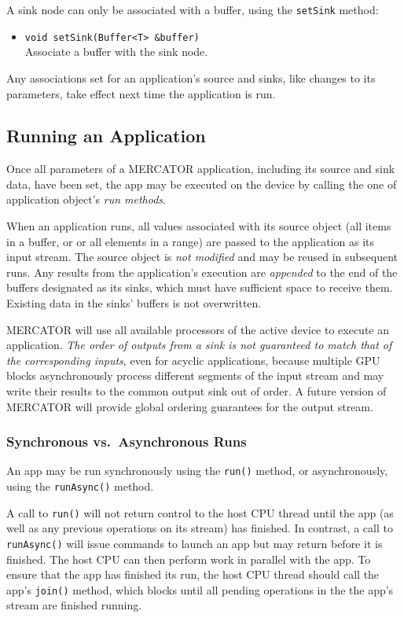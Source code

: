 \documentclass[11pt]{article}
\begin{document}
A sink node can only be associated with a buffer, using the 
\texttt{setSink} method:
\begin{itemize}

\item \texttt{void setSink(Buffer<T> \&buffer)} \\
  Associate a buffer with the sink node.

\end{itemize}
Any associations set for an application's source and sinks, like
changes to its parameters, take effect next time the application is
run.

\subsection{Running an Application}

Once all parameters of a MERCATOR application, including its source
and sink data, have been set, the app may be executed on the device by
calling the one of application object's \textit{run methods}.

When an application runs, all values associated with its source object
(all items in a buffer, or or all elements in a range) are passed to
the application as its input stream. The source object is \emph{not
  modified} and may be reused in subsequent runs.  Any results from
the application's execution are \emph{appended} to the end of the
buffers designated as its sinks, which must have sufficient space to
receive them.  Existing data in the sinks' buffers is not overwritten.

MERCATOR will use all available processors of the active device to
execute an application.  \emph{The order of outputs from a sink is not
  guaranteed to match that of the corresponding inputs}, even for
acyclic applications, because multiple GPU blocks asynchronously
process different segments of the input stream and may write their
results to the common output sink out of order.  A future version of
MERCATOR will provide global ordering guarantees for the output
stream.

\subsubsection{Synchronous vs.\ Asynchronous Runs}

An app may be run synchronously using the \texttt{run()} method,
or asynchronously, using the \texttt{runAsync()} method.

A call to \texttt{run()} will not return control to the host CPU
thread until the app (as well as any previous operations on its
stream) has finished.  In contrast, a call to \texttt{runAsync()} will
issue commands to launch an app but may return before it is finished.
The host CPU can then perform work in parallel with the app.  To
ensure that the app has finished its run, the host CPU thread should
call the app's \texttt{join()} method, which blocks until all pending
operations in the the app's stream are finished running.
\end{document}
